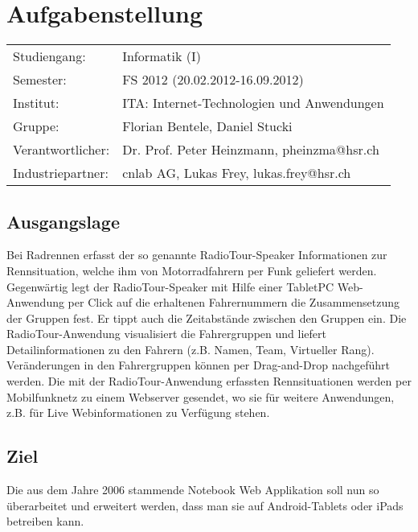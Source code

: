 \chapter*{Aufgabenstellung}

\begin{tabular}{ll}
Studiengang: & Informatik (I)\\
Semester: & FS 2012 (20.02.2012-16.09.2012)\\
Institut: & ITA: Internet-Technologien und Anwendungen\\
Gruppe: & Florian Bentele, Daniel Stucki\\
Verantwortlicher: & Dr. Prof. Peter Heinzmann, pheinzma@hsr.ch\\
Industriepartner: & cnlab AG, Lukas Frey, lukas.frey@hsr.ch

\end{tabular}

\section*{Ausgangslage}
Bei Radrennen erfasst der so genannte RadioTour-Speaker Informationen zur Rennsituation, welche ihm von Motorradfahrern per Funk geliefert werden. Gegenwärtig legt der RadioTour-Speaker mit Hilfe einer TabletPC Web-Anwendung per Click auf die erhaltenen Fahrernummern die Zusammensetzung der Gruppen fest. Er tippt auch die Zeitabstände zwischen den Gruppen ein. Die RadioTour-Anwendung  visualisiert die Fahrergruppen und liefert Detailinformationen zu den Fahrern (z.B. Namen, Team, Virtueller Rang). Veränderungen in den Fahrergruppen können per Drag-and-Drop nachgeführt werden. Die mit der RadioTour-Anwendung erfassten Rennsituationen werden per Mobilfunknetz zu einem Webserver gesendet, wo sie für weitere Anwendungen, z.B. für Live Webinformationen zu Verfügung stehen.

\section*{Ziel}
Die aus dem Jahre 2006 stammende Notebook Web Applikation soll nun so überarbeitet und erweitert werden, dass man sie auf Android-Tablets oder iPads betreiben kann.

